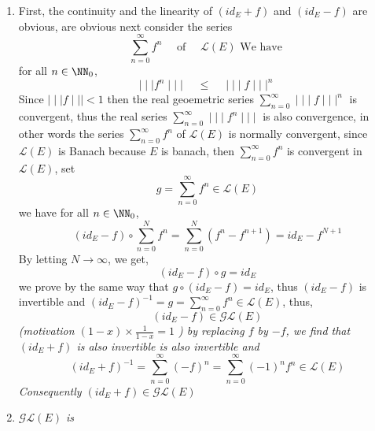 \begin{enumerate}[(1)]
\item  First, the continuity and the 
       linearity of $\left( id_{E} + f \right) $  
       and $\left( id_{E} - f \right) $ are obvious, 
       are obvious next consider the series 
       \[
	       \sum_{n=0}^{\infty}  f^{n}  
	       \quad \text{ of }  \quad 
	       \mathcal{L} \left( E \right) 
	       \text{ We have } 
       \]
       for all $n \in \NN_{0} $,
       \[
       \mid \mid \mid  f^n  \mid \mid \mid  \quad 
       \leq \quad  \mid \mid \mid  f \mid \mid \mid ^n 
       \]
       Since $\mid \mid \mid  f \mid \mid \mid  <  1 $ then
       the real geoemetric series 
       $\sum_{n=0}^{\infty}  \mid \mid \mid  f \mid \mid \mid ^n  $ 
       is convergent, thus 
       the real series $\sum_{n=0}^{\infty}  
       \mid \mid \mid  f^n  \mid \mid \mid $ 
       is also convergence, in other words the series
       $\sum_{n=0}^{\infty}  f^n  $  of $\mathcal{L} (E)  $ 
       is normally convergent, since 
       $\mathcal{L} (E)  $ is Banach because $E $ is banach,
       then $\sum_{n=0}^{\infty}  f^n  $ is convergent 
       in $\mathcal{L}(E)$, set 
       \[
       g = \sum_{n=0}^{\infty}  f^n \in  \mathcal{L} (E)  
       \]
       we have for all $n \in \NN_0$,
       \[
       \left( id_{E} - f \right) \circ 
       \sum_{n=0}^{N} 
       f^n  = 
       \sum_{n=0}^{N} \left( f^n - f^{n+1} \right) =
       id_{E} - f^{N+1}
       \]
       By letting $N \rightarrow \infty  $, we get, 
       \[
       \left( id_{E} - f \right) \circ 
       g = id_{E} 
       \]
       we prove by the same way that 
       $g \circ  \left( id_{E}-f \right)  = id_{E}$, 
       thus $\left( id_{E} - f \right) $ is invertible 
       and $\left( id_{E} - f \right)^{-1} = g =
       \sum_{n=0}^{\infty }f^n \in \mathcal{L} (E)$, thus, 
       \[
       \left( id_{E} -f  \right) \in 
       \mathcal{G} \mathcal{L} (E)  
       \]
       \divider
       \it (motivation $(1-x) \times \frac{1}{1-x}  = 1 $ )
       \divider
       by replacing $f $ by $-f$, we find that 
       $\left( id_{E} + f \right) $ is also invertible is also
       invertible and 
       \[
       \left( id_{E} + f \right)^{-1}=
       \sum_{n=0}^{\infty}  (-f) ^n = 
       \sum_{n=0}^{\infty}  (-1) ^n f^n 
       \in  \mathcal{L} (E) 
       \]
       Consequently $\left( id_{E} + f \right) \in \mathcal{G} 
       \mathcal{L} (E)$  
     \item 
	     \begin{center}
	     	\it $\mathcal{G} \mathcal{L} (E)  $ is 

\end{center}
\end{enumerate}
